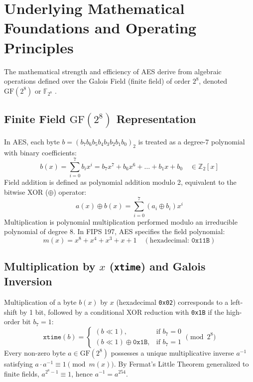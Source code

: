 \section{Underlying Mathematical Foundations and Operating Principles}
The mathematical strength and efficiency of AES derive from algebraic operations defined over the Galois Field (finite field) of order $2^8$, denoted $\text{GF}(2^8)$ or $\mathbb{F}_{2^8}$ \cite{paarpelzl}.

\subsection{Finite Field $\text{GF}(2^8)$ Representation}
In AES, each byte $b = (b_7 b_6 b_5 b_4 b_3 b_2 b_1 b_0)_2$ is treated as a degree-7 polynomial with binary coefficients:
\begin{equation}
b(x) = \sum_{i=0}^7 b_i x^i = b_7 x^7 + b_6 x^6 + \dots + b_1 x + b_0 \quad \in \mathbb{Z}_2[x]
\end{equation}
Field addition is defined as polynomial addition modulo 2, equivalent to the bitwise XOR ($\oplus$) operator:
\begin{equation}
a(x) \oplus b(x) = \sum_{i=0}^7 (a_i \oplus b_i) x^i
\end{equation}
Multiplication is polynomial multiplication performed modulo an irreducible polynomial of degree 8. In FIPS 197, AES specifies the field polynomial:
\begin{equation}
m(x) = x^8 + x^4 + x^3 + x + 1 \quad (\text{hexadecimal: } \texttt{0x11B})
\end{equation}

\subsection{Multiplication by $x$ (\texttt{xtime}) and Galois Inversion}
Multiplication of a byte $b(x)$ by $x$ (hexadecimal \texttt{0x02}) corresponds to a left-shift by 1 bit, followed by a conditional XOR reduction with \texttt{0x1B} if the high-order bit $b_7 = 1$:
\begin{equation}
\texttt{xtime}(b) = 
\begin{cases} 
(b \ll 1), & \text{if } b_7 = 0 \\
(b \ll 1) \oplus \texttt{0x1B}, & \text{if } b_7 = 1
\end{cases} \pmod{2^8}
\end{equation}
Every non-zero byte $a \in \text{GF}(2^8)$ possesses a unique multiplicative inverse $a^{-1}$ satisfying $a \cdot a^{-1} \equiv 1 \pmod{m(x)}$. By Fermat's Little Theorem generalized to finite fields, $a^{2^8 - 1} \equiv 1$, hence $a^{-1} = a^{254}$.

